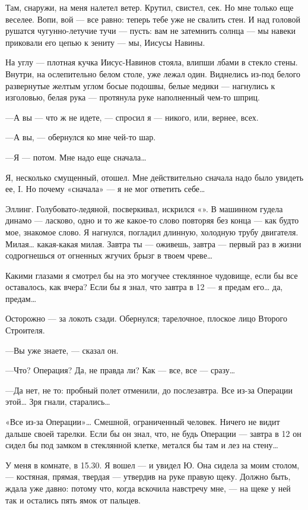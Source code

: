 \documentclass[11pt,openany]{book}
\begin{document}
Там, снаружи, на меня налетел ветер. Крутил, свистел, сек. Но мне только еще веселее. Вопи, вой --- все равно: теперь тебе уже не свалить стен. И над головой рушатся чугунно-летучие тучи --- пусть: вам не затемнить солнца --- мы навеки приковали его цепью к зениту --- мы, Иисусы Навины.

На углу --- плотная кучка Иисус-Навинов стояла, влипши лбами в стекло стены. Внутри, на ослепительно белом столе, уже лежал один. Виднелись из-под белого развернутые желтым углом босые подошвы, белые медики --- нагнулись к изголовью, белая рука --- протянула руке наполненный чем-то шприц.

---А вы --- что ж не идете, --- спросил я --- никого, или, вернее, всех.

---А вы, --- обернулся ко мне чей-то шар.

---Я --- потом. Мне надо еще сначала\ldots{}

Я, несколько смущенный, отошел. Мне действительно сначала надо было увидеть ее, I. Но почему «сначала» --- я не мог ответить себе\ldots{}

Эллинг. Голубовато-ледяной, посверкивал, искрился «». В машинном гудела динамо --- ласково, одно и то же какое-то слово повторяя без конца --- как будто мое, знакомое слово. Я нагнулся, погладил длинную, холодную трубу двигателя. Милая\ldots{} какая-какая милая. Завтра ты --- оживешь, завтра --- первый раз в жизни содрогнешься от огненных жгучих брызг в твоем чреве\ldots{}

Какими глазами я смотрел бы на это могучее стеклянное чудовище, если бы все оставалось, как вчера? Если бы я знал, что завтра в 12 --- я предам его\ldots{} да, предам\ldots{}

Осторожно --- за локоть сзади. Обернулся; тарелочное, плоское лицо Второго Строителя.

---Вы уже знаете, --- сказал он.

---Что? Операция? Да, не правда ли? Как --- все, все --- сразу\ldots{}

---Да нет, не то: пробный полет отменили, до послезавтра. Все из-за Операции этой\ldots{} Зря гнали, старались\ldots{}

«Все из-за Операции»\ldots{} Смешной, ограниченный человек. Ничего не видит дальше своей тарелки. Если бы он знал, что, не будь Операции --- завтра в 12 он сидел бы под замком в стеклянной клетке, метался бы там и лез на стену\ldots{}

У меня в комнате, в 15.30. Я вошел --- и увидел Ю. Она сидела за моим столом, --- костяная, прямая, твердая --- утвердив на руке правую щеку. Должно быть, ждала уже давно: потому что, когда вскочила навстречу мне, --- на щеке у ней так и остались пять ямок от пальцев.
\end{document}
